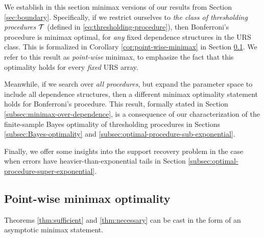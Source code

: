 
We establish in this section minimax versions of our results from Section \ref{sec:boundary}.
Specifically, if we restrict ourselves to \emph{the class of thresholding procedures} $\cal T$ (defined in \eqref{eq:thresholding-procedure}), then Bonferroni's procedure is minimax optimal, for \emph{any} fixed dependence structures in the URS class.
This is formalized in Corollary \ref{cor:point-wise-minimax} in Section \ref{subsec:point-wise-minimax}.
We refer to this result as \emph{point-wise} minimax, to emphasize the fact that this optimality holds for every \emph{fixed} URS array.

Meanwhile, if we search over \emph{all procedures}, but expand the parameter space to include {all} dependence structures, then a different minimax optimality statement holds for Bonferroni's procedure.
This result, formally stated in Section \ref{subsec:minimax-over-dependence}, is a consequence of our characterization of the finite-sample Bayes optimality of thresholding procedures in Sections \ref{subsec:Bayes-optimality} and \ref{subsec:optimal-procedure-sub-exponential}.

Finally, we offer some insights into the support recovery problem in the case when errors have heavier-than-exponential tails in Section \ref{subsec:optimal-procedure-super-exponential}.

\subsection{Point-wise minimax optimality}
\label{subsec:point-wise-minimax}

Theorems \ref{thm:sufficient} and \ref{thm:necessary} can be cast in the form of an asymptotic minimax statement. 

